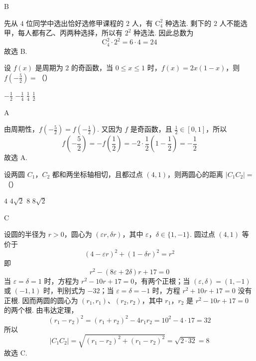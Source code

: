 \begin{answer}
B
\end{answer}

\begin{solution}
先从 \(4\) 位同学中选出恰好选修甲课程的 \(2\) 人，有 \(\mathrm C_4^2\) 种选法. 剩下的 \(2\) 人不能选甲，每人都有乙、丙两种选择，所以有 \(2^2\) 种选法. 因此总数为
\[
\mathrm C_4^2\cdot2^2=6\cdot4=24
\]
故选 B.
\end{solution}

\begin{problem}
设 \(f(x)\) 是周期为 \(2\) 的奇函数，当 \(0\leqslant x\leqslant1\) 时，\(f(x)=2x(1-x)\)，则 \(f\left(-\frac{5}{2}\right)=\)（\quad）

\choices
    {\(-\frac{1}{2}\)}
    {\(-\frac{1}{4}\)}
    {\(\frac{1}{4}\)}
    {\(\frac{1}{2}\)}
\end{problem}

\begin{answer}
A
\end{answer}

\begin{solution}
由周期性，\(f\left(-\frac{5}{2}\right)=f\left(-\frac{1}{2}\right)\). 又因为 \(f\) 是奇函数，且 \(\frac{1}{2}\in[0,1]\)，所以
\[
f\left(-\frac{5}{2}\right)=-f\left(\frac{1}{2}\right)=-2\cdot\frac{1}{2}\left(1-\frac{1}{2}\right)=-\frac{1}{2}
\]
故选 A.
\end{solution}

\begin{problem}
设两圆 \(C_1\)，\(C_2\) 都和两坐标轴相切，且都过点 \((4,1)\)，则两圆心的距离 \(|C_1C_2|=\)（\quad）

\choices
    {\(4\)}
    {\(4\sqrt{2}\)}
    {\(8\)}
    {\(8\sqrt{2}\)}
\end{problem}

\begin{answer}
C
\end{answer}

\begin{solution}
设圆的半径为 \(r>0\)，圆心为 \((\varepsilon r,\delta r)\)，其中 \(\varepsilon\)，\(\delta\in\{1,-1\}\). 圆过点 \((4,1)\) 等价于
\[
(4-\varepsilon r)^2+(1-\delta r)^2=r^2
\]
即
\[
r^2-(8\varepsilon+2\delta)r+17=0
\]
当 \(\varepsilon=\delta=1\) 时，方程为 \(r^2-10r+17=0\)，有两个正根；当 \((\varepsilon,\delta)=(1,-1)\) 或 \((-1,1)\) 时，判别式为 \(-32\)；当 \(\varepsilon=\delta=-1\) 时，方程 \(r^2+10r+17=0\) 没有正根. 因而两圆的圆心为 \((r_1,r_1)\)、\((r_2,r_2)\)，其中 \(r_1\)，\(r_2\) 是 \(r^2-10r+17=0\) 的两个根. 由韦达定理，
\[
(r_1-r_2)^2=(r_1+r_2)^2-4r_1r_2=10^2-4\cdot17=32
\]
所以
\[
|C_1C_2|=\sqrt{(r_1-r_2)^2+(r_1-r_2)^2}=\sqrt{2\cdot32}=8
\]
故选 C.
\end{solution}


